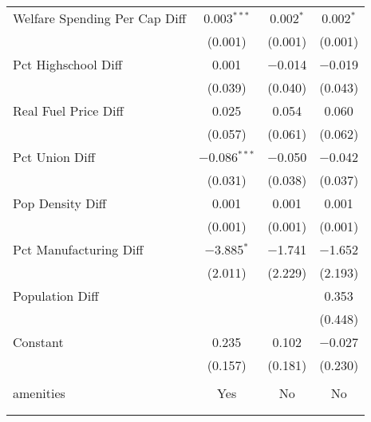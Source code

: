 \begin{table}[!htbp]
\begin{tabular}{@{\extracolsep{5pt}}lccc}
  Welfare Spending Per Cap Diff & 0.003$^{***}$ & 0.002$^{*}$ & 0.002$^{*}$ \\ 
  & (0.001) & (0.001) & (0.001) \\ 
  Pct Highschool Diff & 0.001 & $-$0.014 & $-$0.019 \\ 
  & (0.039) & (0.040) & (0.043) \\ 
  Real Fuel Price Diff & 0.025 & 0.054 & 0.060 \\ 
  & (0.057) & (0.061) & (0.062) \\ 
  Pct Union Diff & $-$0.086$^{***}$ & $-$0.050 & $-$0.042 \\ 
  & (0.031) & (0.038) & (0.037) \\ 
  Pop Density Diff & 0.001 & 0.001 & 0.001 \\ 
  & (0.001) & (0.001) & (0.001) \\ 
  Pct Manufacturing Diff & $-$3.885$^{*}$ & $-$1.741 & $-$1.652 \\ 
  & (2.011) & (2.229) & (2.193) \\ 
  Population Diff &  &  & 0.353 \\ 
  &  &  & (0.448) \\ 
  Constant & 0.235 & 0.102 & $-$0.027 \\ 
  & (0.157) & (0.181) & (0.230) \\ 
 \hline \\[-1.8ex] 
amenities & Yes & No & No \\ 
\hline \\[-1.8ex] 
\hline 
\hline \\[-1.8ex] 
\end{tabular} 
\end{table} 

